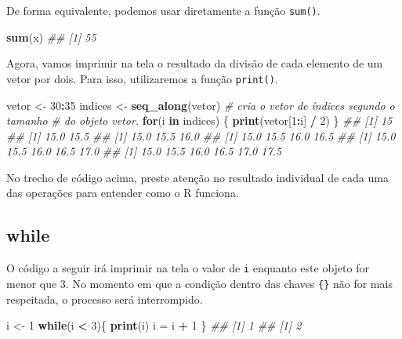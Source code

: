 \documentclass[
]{book}
\newenvironment{Shaded}{\begin{snugshade}}{\end{snugshade}}
\newcommand{\CommentTok}[1]{\textcolor[rgb]{0.56,0.35,0.01}{\textit{#1}}}
\newcommand{\ControlFlowTok}[1]{\textcolor[rgb]{0.13,0.29,0.53}{\textbf{#1}}}
\newcommand{\DecValTok}[1]{\textcolor[rgb]{0.00,0.00,0.81}{#1}}
\newcommand{\KeywordTok}[1]{\textcolor[rgb]{0.13,0.29,0.53}{\textbf{#1}}}
\newcommand{\NormalTok}[1]{#1}
\newcommand{\OperatorTok}[1]{\textcolor[rgb]{0.81,0.36,0.00}{\textbf{#1}}}
\newcommand{\StringTok}[1]{\textcolor[rgb]{0.31,0.60,0.02}{#1}}
\begin{document}
De forma equivalente, podemos usar diretamente a função \texttt{sum()}.

\begin{Shaded}
\begin{Highlighting}[]
\KeywordTok{sum}\NormalTok{(x)}
\CommentTok{## [1] 55}
\end{Highlighting}
\end{Shaded}

Agora, vamos imprimir na tela o resultado da divisão de cada elemento de um vetor por dois. Para isso, utilizaremos a função \texttt{print()}.

\begin{Shaded}
\begin{Highlighting}[]
\NormalTok{vetor <-}\StringTok{ }\DecValTok{30}\OperatorTok{:}\DecValTok{35}
\NormalTok{indices <-}\StringTok{ }\KeywordTok{seq_along}\NormalTok{(vetor) }\CommentTok{# cria o vetor de índices segundo o tamanho }
                            \CommentTok{# do objeto vetor.   }
\ControlFlowTok{for}\NormalTok{(i }\ControlFlowTok{in}\NormalTok{ indices) \{}
  \KeywordTok{print}\NormalTok{(vetor[}\DecValTok{1}\OperatorTok{:}\NormalTok{i] }\OperatorTok{/}\StringTok{ }\DecValTok{2}\NormalTok{)}
\NormalTok{\}}
\CommentTok{## [1] 15}
\CommentTok{## [1] 15.0 15.5}
\CommentTok{## [1] 15.0 15.5 16.0}
\CommentTok{## [1] 15.0 15.5 16.0 16.5}
\CommentTok{## [1] 15.0 15.5 16.0 16.5 17.0}
\CommentTok{## [1] 15.0 15.5 16.0 16.5 17.0 17.5}
\end{Highlighting}
\end{Shaded}

No trecho de código acima, preste atenção no resultado individual de cada uma das operações para entender como o R funciona.

\hypertarget{while}{%
\subsection{while}\label{while}}

O código a seguir irá imprimir na tela o valor de \texttt{i} enquanto este objeto for menor que 3. No momento em que a condição dentro das chaves \texttt{\{\}} não for mais respeitada, o processo será interrompido.

\begin{Shaded}
\begin{Highlighting}[]
\NormalTok{i <-}\StringTok{ }\DecValTok{1}
\ControlFlowTok{while}\NormalTok{(i }\OperatorTok{<}\StringTok{ }\DecValTok{3}\NormalTok{)\{}
  \KeywordTok{print}\NormalTok{(i)}
\NormalTok{  i =}\StringTok{ }\NormalTok{i }\OperatorTok{+}\StringTok{ }\DecValTok{1}
\NormalTok{\}}
\CommentTok{## [1] 1}
\CommentTok{## [1] 2}
\end{Highlighting}
\end{Shaded}
\end{document}

